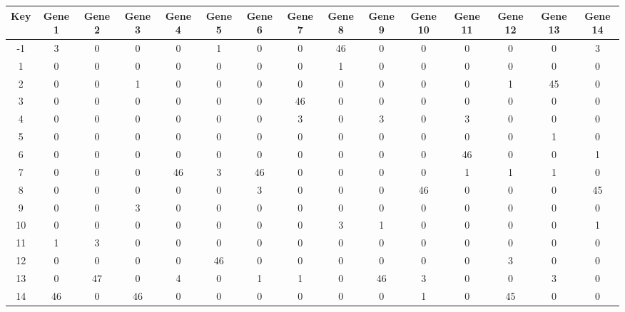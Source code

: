 \begin{tabular}{|c|c|c|c|c|c|c|c|c|c|c|c|c|c|c|}
\hline
Key & Gene 1 & Gene 2 & Gene 3 & Gene 4 & Gene 5 & Gene 6 & Gene 7 & Gene 8 & Gene 9 & Gene 10 & Gene 11 & Gene 12 & Gene 13 & Gene 14 \\
\hline
-1 & 3 & 0 & 0 & 0 & 1 & 0 & 0 & 46 & 0 & 0 & 0 & 0 & 0 & 3 \\
1 & 0 & 0 & 0 & 0 & 0 & 0 & 0 & 1 & 0 & 0 & 0 & 0 & 0 & 0 \\
2 & 0 & 0 & 1 & 0 & 0 & 0 & 0 & 0 & 0 & 0 & 0 & 1 & 45 & 0 \\
3 & 0 & 0 & 0 & 0 & 0 & 0 & 46 & 0 & 0 & 0 & 0 & 0 & 0 & 0 \\
4 & 0 & 0 & 0 & 0 & 0 & 0 & 3 & 0 & 3 & 0 & 3 & 0 & 0 & 0 \\
5 & 0 & 0 & 0 & 0 & 0 & 0 & 0 & 0 & 0 & 0 & 0 & 0 & 1 & 0 \\
6 & 0 & 0 & 0 & 0 & 0 & 0 & 0 & 0 & 0 & 0 & 46 & 0 & 0 & 1 \\
7 & 0 & 0 & 0 & 46 & 3 & 46 & 0 & 0 & 0 & 0 & 1 & 1 & 1 & 0 \\
8 & 0 & 0 & 0 & 0 & 0 & 3 & 0 & 0 & 0 & 46 & 0 & 0 & 0 & 45 \\
9 & 0 & 0 & 3 & 0 & 0 & 0 & 0 & 0 & 0 & 0 & 0 & 0 & 0 & 0 \\
10 & 0 & 0 & 0 & 0 & 0 & 0 & 0 & 3 & 1 & 0 & 0 & 0 & 0 & 1 \\
11 & 1 & 3 & 0 & 0 & 0 & 0 & 0 & 0 & 0 & 0 & 0 & 0 & 0 & 0 \\
12 & 0 & 0 & 0 & 0 & 46 & 0 & 0 & 0 & 0 & 0 & 0 & 3 & 0 & 0 \\
13 & 0 & 47 & 0 & 4 & 0 & 1 & 1 & 0 & 46 & 3 & 0 & 0 & 3 & 0 \\
14 & 46 & 0 & 46 & 0 & 0 & 0 & 0 & 0 & 0 & 1 & 0 & 45 & 0 & 0 \\
\hline
\end{tabular}